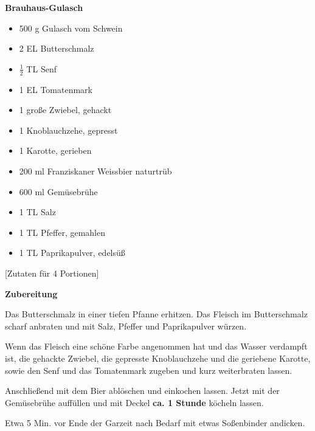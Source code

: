 

\parindent0pt	

\pagestyle{empty}


\textbf{{\LARGE Brauhaus-Gulasch}}%

\hrulefill
\vspace*{\fill}
\begin{multicols}{2}	


\begin{itemize}
\item 500 g Gulasch vom Schwein
\item 2 EL Butterschmalz
\item $\frac{1}{2}$ TL Senf
\item 1 EL Tomatenmark
\item 1 große Zwiebel, gehackt
\item 1 Knoblauchzehe, gepresst
\item 1 Karotte, gerieben
\item 200 ml Franziskaner Weissbier \newline
naturtrüb
\item 600 ml Gemüsebrühe
\item 1 TL Salz
\item 1 TL Pfeffer, gemahlen
\item 1 TL Paprikapulver, edelsüß
\end{itemize}
\end{multicols}
\vfill									%

\vspace{0.1 cm}
%
\begin{center}
%
[Zutaten für 4 Portionen]%
\end{center}


\vfill
\newpage
\textbf{{\LARGE Zubereitung}}%

\hrulefill

\vspace*{\fill}
\begin{multicols}{2}

Das Butterschmalz in einer tiefen Pfanne erhitzen. \newline
Das Fleisch im Butterschmalz scharf anbraten und mit Salz, Pfeffer und Paprikapulver würzen.\newline

Wenn das Fleisch eine schöne Farbe angenommen hat und das Wasser verdampft ist, die gehackte Zwiebel, die gepresste
Knoblauchzehe und die geriebene Karotte, sowie den Senf und das Tomatenmark zugeben und kurz weiterbraten lassen.\newline

Anschließend mit dem Bier ablöschen und einkochen lassen. Jetzt mit der Gemüsebrühe auffüllen und mit Deckel \textbf{ca. 1 Stunde} köcheln lassen.\newline

Etwa 5 Min. vor Ende der Garzeit nach Bedarf mit etwas Soßenbinder andicken.

\end{multicols}
\vfill
